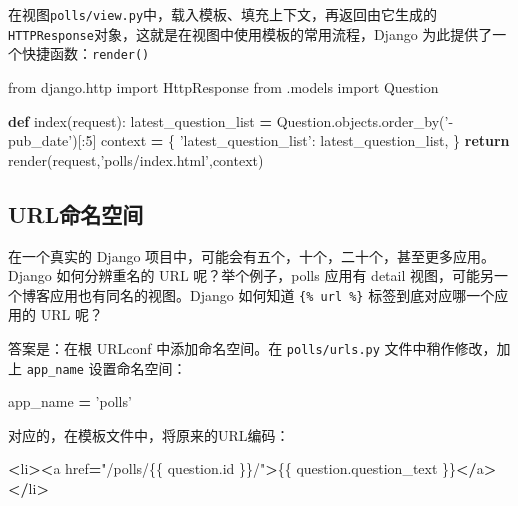 \documentclass[]{ctexbook}
\newenvironment{Shaded}{\begin{snugshade}}{\end{snugshade}}
\newcommand{\ControlFlowTok}[1]{\textcolor[rgb]{0.13,0.29,0.53}{\textbf{#1}}}
\newcommand{\DecValTok}[1]{\textcolor[rgb]{0.00,0.00,0.81}{#1}}
\newcommand{\ImportTok}[1]{#1}
\newcommand{\KeywordTok}[1]{\textcolor[rgb]{0.13,0.29,0.53}{\textbf{#1}}}
\newcommand{\NormalTok}[1]{#1}
\newcommand{\OperatorTok}[1]{\textcolor[rgb]{0.81,0.36,0.00}{\textbf{#1}}}
\newcommand{\SpecialCharTok}[1]{\textcolor[rgb]{0.00,0.00,0.00}{#1}}
\newcommand{\StringTok}[1]{\textcolor[rgb]{0.31,0.60,0.02}{#1}}
\begin{document}
在视图\texttt{polls/view.py}中，载入模板、填充上下文，再返回由它生成的\texttt{HTTPResponse}对象，这就是在视图中使用模板的常用流程，Django 为此提供了一个快捷函数：\texttt{render()}

\begin{Shaded}
\begin{Highlighting}[]
\ImportTok{from}\NormalTok{ django.http }\ImportTok{import}\NormalTok{ HttpResponse}
\ImportTok{from}\NormalTok{ .models }\ImportTok{import}\NormalTok{ Question}

\KeywordTok{def}\NormalTok{ index(request):}
\NormalTok{    latest_question_list }\OperatorTok{=}\NormalTok{ Question.objects.order_by(}\StringTok{'-pub_date'}\NormalTok{)[:}\DecValTok{5}\NormalTok{]}
\NormalTok{    context }\OperatorTok{=}\NormalTok{ \{}
        \StringTok{'latest_question_list'}\NormalTok{: latest_question_list,}
\NormalTok{    \}}
    \ControlFlowTok{return}\NormalTok{ render(request,}\StringTok{'polls/index.html'}\NormalTok{,context)}
\end{Highlighting}
\end{Shaded}

\hypertarget{urlux547dux540dux7a7aux95f4}{%
\subsection{URL命名空间}\label{urlux547dux540dux7a7aux95f4}}

在一个真实的 Django 项目中，可能会有五个，十个，二十个，甚至更多应用。Django 如何分辨重名的 URL 呢？举个例子，polls 应用有 detail 视图，可能另一个博客应用也有同名的视图。Django 如何知道 \texttt{\{\%\ url\ \%\}} 标签到底对应哪一个应用的 URL 呢？

答案是：在根 URLconf 中添加命名空间。在 \texttt{polls/urls.py} 文件中稍作修改，加上 \texttt{app\_name} 设置命名空间：

\begin{Shaded}
\begin{Highlighting}[]
\NormalTok{app_name }\OperatorTok{=} \StringTok{'polls'}
\end{Highlighting}
\end{Shaded}

对应的，在模板文件中，将原来的URL编码：

\begin{Shaded}
\begin{Highlighting}[]
\OperatorTok{<}\NormalTok{li}\OperatorTok{><}\NormalTok{a href}\OperatorTok{=}\StringTok{"/polls/}\SpecialCharTok{\{\{}\StringTok{ question.id }\SpecialCharTok{\}\}}\StringTok{/"}\OperatorTok{>}\NormalTok{\{\{ question.question_text \}\}}\OperatorTok{</}\NormalTok{a}\OperatorTok{></}\NormalTok{li}\OperatorTok{>}
\end{Highlighting}
\end{Shaded}
\end{document}
